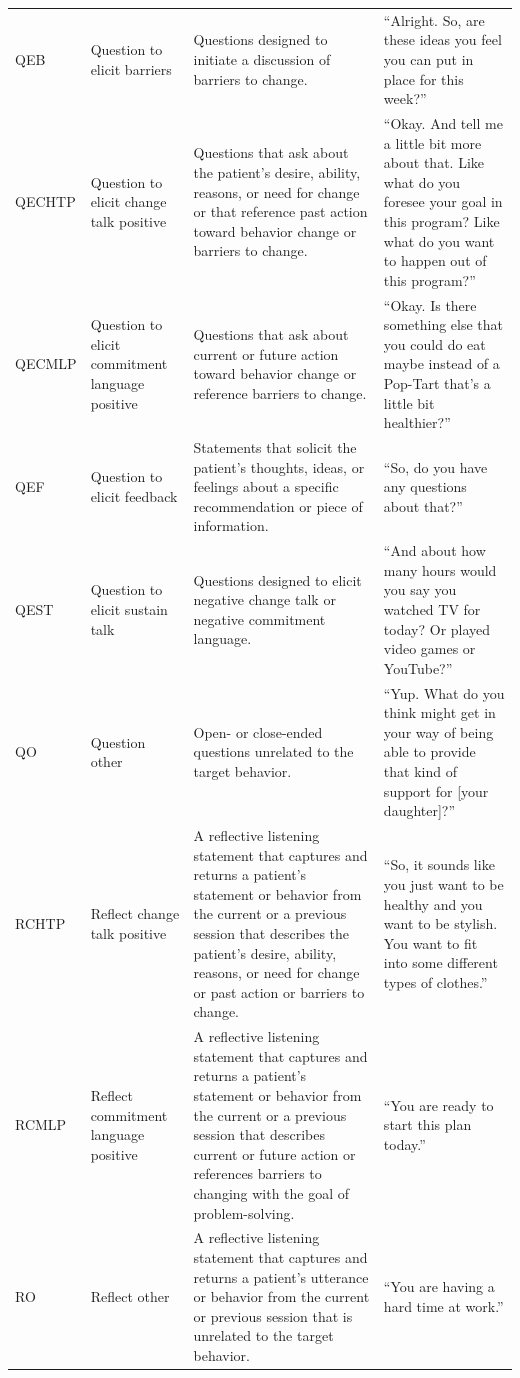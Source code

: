 \begin{small}
\begin{longtable}{p{1.3cm}p{2cm}p{5cm}p{4.8cm}}
QEB & Question to elicit barriers & Questions designed to initiate a discussion of barriers to change. & ``Alright.  So, are these ideas you feel you can put in place for this week?''\\
QECHTP & Question to elicit change talk positive & Questions that ask about the patient's desire, ability, reasons, or need for change or that reference past action toward behavior change or barriers to change. & ``Okay.  And tell me a little bit more about that.  Like what do you foresee your goal in this program?  Like what do you want to happen out of this program?''\\
QECMLP & Question to elicit commitment language positive & Questions that ask about current or future action toward behavior change or reference barriers to change. & ``Okay.  Is there something else that you could do eat maybe instead of a Pop-Tart that's a little bit healthier?''\\
QEF & Question to elicit feedback & Statements that solicit the patient's thoughts, ideas, or feelings about a specific recommendation or piece of information. & ``So, do you have any questions about that?''\\
QEST & Question to elicit sustain talk & Questions designed to elicit negative change talk or negative commitment language. & ``And about how many hours would you say you watched TV for today?  Or played video games or YouTube?''\\
QO & Question other & Open- or close-ended questions unrelated to the target behavior. & ``Yup. What do you think might get in your way of being able to provide that kind of support for [your daughter]?''\\
RCHTP & Reflect change talk positive & A reflective listening statement that captures and returns a patient's statement or behavior from the current or a previous session that describes the patient's desire, ability, reasons, or need for change or past action or barriers to change. & ``So, it sounds like you just want to be healthy and you want to be stylish. You want to fit into some different types of clothes.''\\
RCMLP & Reflect commitment language positive & A reflective listening statement that captures and returns a patient's statement or behavior from the current or a previous session that describes current or future action or references barriers to changing with the goal of problem-solving. & ``You are ready to start this plan today.''\\
RO & Reflect other & A reflective listening statement that captures and returns a patient's utterance or behavior from the current or previous session that is unrelated to the target behavior. & ``You are having a hard time at work.''\\

\end{longtable}
\end{small}
